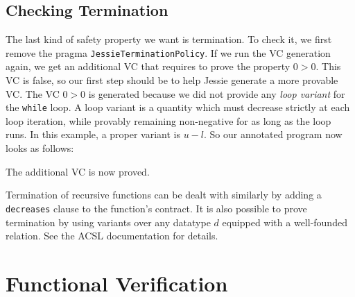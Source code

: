 \documentclass[a4paper,11pt,twoside,openright]{report}
\begin{document}




\section{Checking Termination}

The last kind of safety property we want is termination. To check it,
we first remove the pragma \texttt{JessieTerminationPolicy}. If we run
the VC generation again, we get an additional VC that requires to prove
the property $0 > 0$. This VC is false, so our first step should be
to help Jessie generate a more provable VC.
The VC $0 > 0$ is generated because we did not provide any
\emph{loop variant} for the \texttt{while} loop. A loop variant is a
quantity which must decrease strictly at each loop iteration, while
provably remaining non-negative for as long as the loop runs. 
In this example, a proper variant is $u-l$. 
So our annotated program now looks as follows:



The additional VC is now proved.

Termination of recursive functions can be dealt with similarly by
adding a \texttt{decreases} clause to the function's contract. 
It is also possible to prove termination by using variants over 
any datatype $d$ equipped with a well-founded relation. 
See the ACSL documentation for details.




\chapter{Functional Verification}
\end{document}
